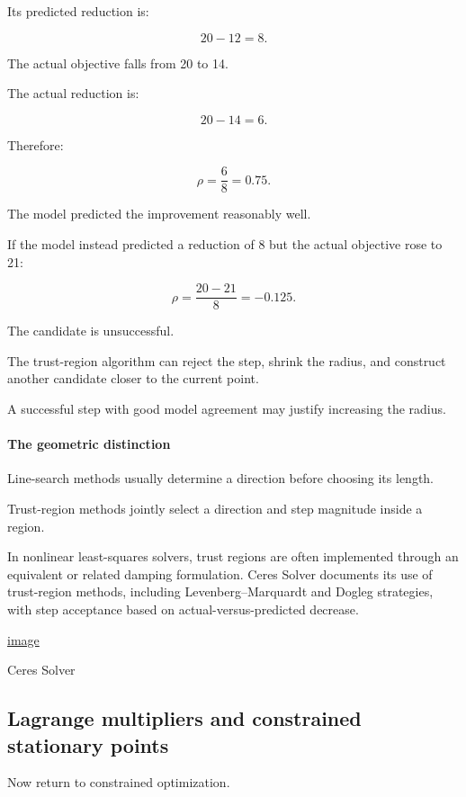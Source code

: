 Its predicted reduction is:

\[
20-12=8.
\]

The actual objective falls from 20 to 14.

The actual reduction is:

\[
20-14=6.
\]

Therefore:

\[
\rho=\frac68=\boxed{0.75}.
\]

The model predicted the improvement reasonably well.

If the model instead predicted a reduction of 8 but the actual objective rose to 21:

\[
\rho=\frac{20-21}{8}=-0.125.
\]

The candidate is unsuccessful.

The trust-region algorithm can reject the step, shrink the radius, and construct another candidate closer to the current point.

A successful step with good model agreement may justify increasing the radius.

\paragraph{The geometric distinction}\label{02-foundations-ii-ch026-the-geometric-distinction}

Line-search methods usually determine a direction before choosing its length.

Trust-region methods jointly select a direction and step magnitude inside a region.

In nonlinear least-squares solvers, trust regions are often implemented through an equivalent or related damping formulation. Ceres Solver documents its use of trust-region methods, including Levenberg--Marquardt and Dogleg strategies, with step acceptance based on actual-versus-predicted decrease. 

\href{https://www.google.com/s2/favicons?domain=https://ceres-solver.readthedocs.io&sz=32}{image}

Ceres Solver

\subsection{Lagrange multipliers and constrained stationary points}\label{02-foundations-ii-ch026-lagrange-multipliers-and-constrained-stationary-points}

Now return to constrained optimization.

